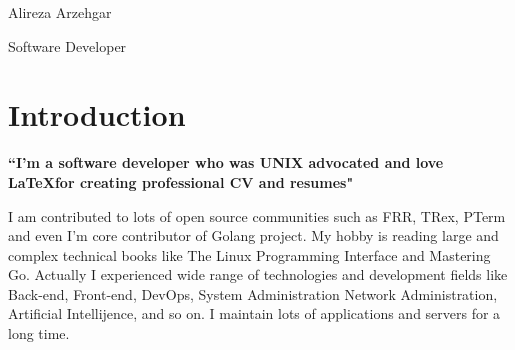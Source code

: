 \documentclass[
	10pt, %
]{FreemanCV}
\begin{document}
\begin{paracol}{2} %


\parbox[][0.11\textheight][c]{\linewidth}{ %
	\centering %
	
	{\sffamily\Huge Alireza Arzehgar} %
	
	\medskip %
	
	{\cursivefont\Huge\textcolor{headings}{Software Developer}}
	
	\vfill %
}


\section{Introduction}

{\raggedright\textbf{``I'm a software developer who was UNIX advocated
		and love \LaTeX for creating professional CV and resumes"}\par}

\medskip %

I am contributed to lots of open source communities such as FRR, TRex, PTerm and even I'm core contributor of Golang project.
My hobby is reading large and complex technical books like The Linux Programming Interface and Mastering Go. Actually I experienced wide range of 
technologies and development fields like Back-end, Front-end, DevOps, System Administration
Network Administration, Artificial Intellijence, and so on.
I maintain lots of applications and servers for a long time.

\medskip %



\end{paracol}
\end{document}
